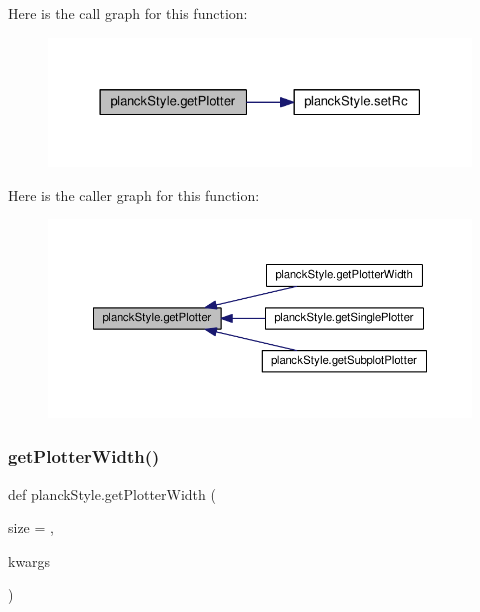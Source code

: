 Here is the call graph for this function\+:
\nopagebreak
\begin{figure}[H]
\begin{center}
\leavevmode
\includegraphics[width=328pt]{namespaceplanckStyle_a23e2fe4d18888ae3aa770201a9c07404_cgraph}
\end{center}
\end{figure}
Here is the caller graph for this function\+:
\nopagebreak
\begin{figure}[H]
\begin{center}
\leavevmode
\includegraphics[width=350pt]{namespaceplanckStyle_a23e2fe4d18888ae3aa770201a9c07404_icgraph}
\end{center}
\end{figure}
\mbox{\label{namespaceplanckStyle_a792131eacb97cbce5b33d2120bc07307}} 
\subsubsection{\texorpdfstring{get\+Plotter\+Width()}{getPlotterWidth()}}
{\footnotesize\ttfamily def planck\+Style.\+get\+Plotter\+Width (\begin{DoxyParamCaption}\item[{}]{size = {},  }\item[{}]{kwargs }\end{DoxyParamCaption})}



